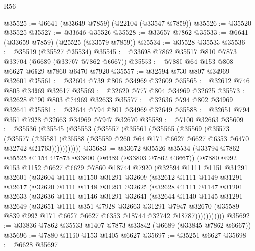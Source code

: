 \begin{lexlean}{R56}
\begin{coremodule}
@35525 := @6641 (@33649 @7859) (@22104 (@33547 @7859))
@35526 := @35520 @35525
@35527 := @33646 @35526
@35528 := @33657 @7862
@35533 := @6641 (@33659 @7859) (@25525 (@33579 @7859))
@35534 := @35528 @35533
@35536 := @35519 (@35527 @35534)
@35545 := @33698 @7862 @35517 @810 @7873 @33704 (@6689 (@33707 @7862 @6667))
@35553 := @7880 @64 @153 @808 @6627 @6629 @7860 @6470 @7920
@35557 := @32594 @730 @807 @34969 @32601
@35561 := @32604 @739 @806 @34969 @32609
@35565 := @32612 @746 @805 @34969 @32617
@35569 := @32620 @777 @804 @34969 @32625
@35573 := @32628 @790 @803 @34969 @32633
@35577 := @32636 @794 @802 @34969 @32641
@35581 := @32644 @794 @801 @34969 @32649
@35588 := @32651 @794 @351 @7928 @32663 @34969 @7947 @32670
@35589 := @7100 @32663
@35609 := @35536
    (@35545
      (@35553
        (@35557
          (@35561
            (@35565
              (@35569
                (@35573
                  (@35577
                    (@35581
                      (@35588 (@35589 @260 @64 @171 @6627 @6627 @6353 @6470 @32742 @21763)))))))))))
@35683 := @33672
    @35526
    @35534
    (@33794
      @7862
      @35525
      @1154
      @7873
      @33800
      (@6689 (@33803 @7862 @6667))
      (@7880
        @992
        @153
        @1152
        @6627
        @6629
        @7860
        @18744
        @7920
        (@32594
          @1111
          @1151
          @31291
          @32601
          (@32604
            @1111
            @1150
            @31291
            @32609
            (@32612
              @1111
              @1149
              @31291
              @32617
              (@32620
                @1111
                @1148
                @31291
                @32625
                (@32628
                  @1111
                  @1147
                  @31291
                  @32633
                  (@32636
                    @1111
                    @1146
                    @31291
                    @32641
                    (@32644
                      @1140
                      @1145
                      @31291
                      @32649
                      (@32651
                        @1111
                        @351
                        @7928
                        @32663
                        @31291
                        @7947
                        @32670
                        (@35589 @839 @992 @171 @6627 @6627 @6353 @18744 @32742 @18787)))))))))))
@35692 := @33836 @7862 @35533 @1407 @7873 @33842 (@6689 (@33845 @7862 @6667))
@35696 := @7880 @1160 @153 @1405 @6627
@35697 := @35251 @6627
@35698 := @6628 @35697

\end{coremodule}
\end{lexlean}
